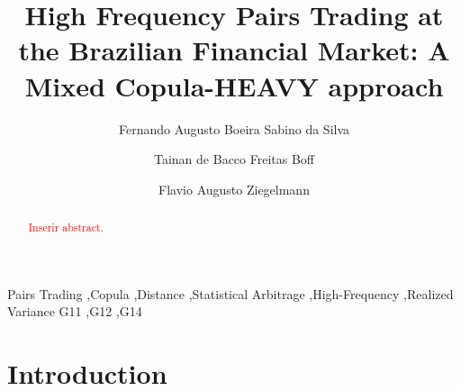 \documentclass[review]{elsarticle}
\begin{document}
\begin{frontmatter}

\title{High Frequency Pairs Trading at the Brazilian Financial Market: A Mixed Copula-HEAVY approach}



\author[address1]{Fernando Augusto Boeira Sabino da Silva}

\author[address2]{Tainan de Bacco Freitas Boff}

\author[address1]{Flavio Augusto Ziegelmann}

\address[address1]{Department of Statistics, Institute of Mathematics and Statistics, Federal University of Rio Grande do Sul, 9500 Bento Gonçalves Av., 43-111, Porto Alegre, RS, 91509-900, Brazil}
\address[address2]{Graduate Program in Economics, Federal University of Rio Grande do Sul, Porto Alegre, Brazil}

\begin{abstract}
\textcolor{red}{Inserir abstract.}
\end{abstract}

\begin{keyword}
Pairs Trading \sep Copula \sep Distance \sep Statistical Arbitrage \sep High-Frequency \sep Realized Variance %
\JEL  G11 \sep G12 \sep G14 
\end{keyword}

\end{frontmatter}

\linenumbers

\section{Introduction}
\end{document}
